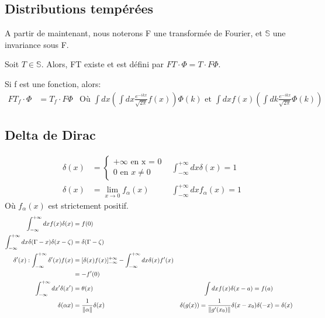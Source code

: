 \documentclass[../notesdecours.tex]{subfiles}
\begin{document}
\subsection{Distributions tempérées}
A partir de maintenant, nous noterons F une transformée de Fourier, et $\mathbb{S}$ une invariance sous F.
\begin{definition} Soit $T \in \mathbb{S}$. Alors, FT existe et est défini par $FT\cdot\Phi = T\cdot F\Phi$.
\end{definition}

Si f est une fonction, alors:
\begin{align}
FT_f\cdot\Phi &= T_f\cdot F\Phi		&\text{Où }\int dx (\int dx \frac{e^{-ikx}}{\sqrt{2\pi}}f(x))\Phi(k) \text{ et } \int dx f(x) (\int dk \frac{e^{-ikx}}{\sqrt{2\pi}}\Phi(k))
\end{align}

\subsection{Delta de Dirac}
\begin{align}
\delta(x) &= \begin{cases}
+\infty \mbox{ en x = 0}\\
0 \mbox{ en } x\neq 0
\end{cases}		&\int^{+\infty}_{-\infty} dx \delta (x) = 1\\
\delta(x) &= \lim_{x\to 0} f_{\alpha}(x)	&\int^{+\infty}_{-\infty} dx f_\alpha (x) = 1
\end{align}
Où $f_\alpha (x)$ est strictement positif.
\begin{align}
\int_{-\infty}^{+\infty} dx f(x)\delta(x) &= f(0)\\
\int_{-\infty}^{+\infty} dx \delta(\Gamma - x)\delta(x- \zeta) &= \delta (\Gamma - \zeta)\\
\delta '(x) : \int^{+\infty}_{-\infty} \delta '(x)f(x) &= [\delta(x)f(x)]_{-\infty}^{+\infty} - \int_{-\infty}^{+\infty} dx \delta(x)f'(x)\\
&= -f'(0)\\
\int_{-\infty}^{+\infty} dx' \delta(x') &= \theta(x)		&\int dx f(x)\delta(x-a) = f(a)\\
\delta(\alpha x) &= \frac{1}{\norm{\alpha}}\delta(x)	&\delta(g(x)) = \frac{1}{\norm{g'(x_0)}}\delta(x-x_0)
\delta(-x) &= \delta(x)\\
\end{align}
\end{document}
